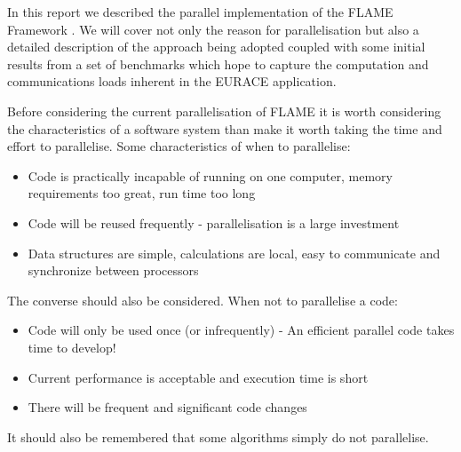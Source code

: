 In this report we described the parallel implementation of the FLAME Framework \cite{Coakley}. We will cover not only the reason for parallelisation but also a detailed description of the approach being adopted coupled with some initial results from a set of benchmarks which hope to capture the computation and communications loads inherent in the EURACE application.

Before considering the current parallelisation of FLAME it is worth considering the characteristics of a software system than make it worth taking the time and effort to parallelise. Some characteristics of when to parallelise:
\begin{itemize}
\item Code is practically incapable of running on one computer, memory requirements too great, run time too long
\item Code will be reused frequently - parallelisation is a large investment
\item Data structures are simple, calculations are local, easy to communicate and synchronize between processors
\end{itemize}
The converse should also be considered. When not to parallelise a code:
\begin{itemize}
\item Code will only be used once (or infrequently) - An efficient parallel code takes time to develop!
\item Current performance is acceptable and execution time is short
\item There will be frequent and significant code changes
\end{itemize}
It should also be remembered that some algorithms simply do not parallelise.

